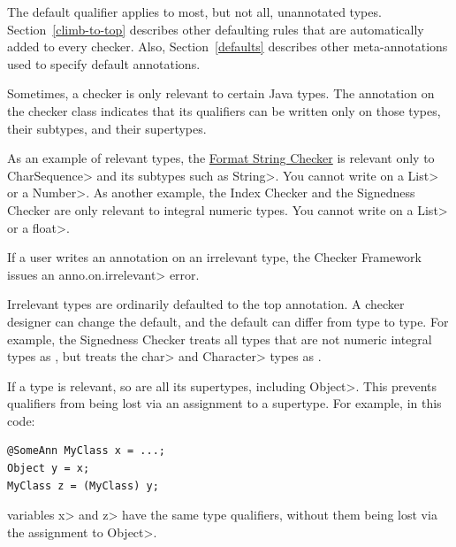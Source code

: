 The default qualifier applies to most, but not all, unannotated types.
Section~\ref{climb-to-top} describes
other defaulting rules that are automatically added to every checker.
Also, Section~\ref{defaults}
describes other meta-annotations used to specify default annotations.



Sometimes, a checker is only relevant to certain Java types.
The 
annotation on the checker class indicates that its qualifiers can be
written only on those types, their subtypes, and their supertypes.

As an example of relevant types, the \hyperref[formatter-checker]{Format
String Checker} is relevant only to \<CharSequence> and its subtypes such
as \<String>.  You cannot write 
on a \<List> or a \<Number>.
%
As another example, the Index Checker and the Signedness Checker are only
relevant to integral numeric types.  You cannot write
 on a \<List> or a \<float>.

If a user writes an annotation on an irrelevant type, the Checker Framework
issues an \<anno.on.irrelevant> error.

Irrelevant types are ordinarily defaulted to the top annotation.
A checker designer can change the default, and the default can differ from type to type.  For
example, the Signedness Checker treats all types that are not numeric
integral types as , but
treats the \<char> and \<Character> types as
.



If a type is relevant, so are all its supertypes, including \<Object>.
This prevents qualifiers from being lost via an assignment to a supertype.
For example, in this code:

\begin{Verbatim}
@SomeAnn MyClass x = ...;
Object y = x;
MyClass z = (MyClass) y;
\end{Verbatim}

\noindent
variables \<x> and \<z> have the same type qualifiers, without them being
lost via the assignment to \<Object>.



